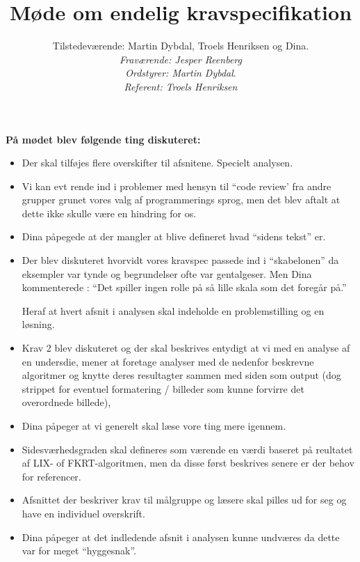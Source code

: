 \documentclass[a4paper,10pt,draft]{article}
\begin{document}
\title{Møde om endelig kravspecifikation}
\author{Tilstedeværende: Martin Dybdal, Troels Henriksen og Dina.\\
\textit{Fraværende: Jesper Reenberg}\\
\textit{Ordstyrer: Martin Dybdal}.\\
\textit{Referent: Troels Henriksen}}
\maketitle


\textbf{På mødet blev følgende ting diskuteret:}
\\

\begin{itemize}

    \item Der skal tilføjes flere overskifter til afsnitene. Specielt analysen.

	\item Vi kan evt rende ind i problemer med hensyn til ``code review' fra andre grupper grunet vores valg af programmerings sprog, men det blev aftalt at dette ikke skulle være en hindring for os.

	\item Dina påpegede at der mangler at blive defineret hvad ``sidens tekst'' er.

	\item Der blev diskuteret hvorvidt vores kravspec passede ind i ``skabelonen'' da eksempler var tynde og begrundelser ofte var gentalgeser. Men Dina kommenterede : ``Det spiller ingen rolle på så lille skala som det foregår på.''

	Heraf at hvert afsnit i analysen skal indeholde en problemstilling og en løsning.

	\item Krav 2 blev diskuteret og der skal beskrives entydigt at vi med en analyse af en undersdie, mener at foretage analyser med de nedenfor beskrevne algoritmer og knytte deres resultagter sammen med siden som output (dog strippet for eventuel formatering / billeder som kunne forvirre det overordnede billede),

	\item Dina påpeger at vi generelt skal læse vore ting mere igennem.

	\item Sidesværhedsgraden skal defineres som værende en værdi baseret på reultatet af LIX- of FKRT-algoritmen, men da disse først beskrives senere er der behov for referencer.

	\item  Afsnittet der beskriver krav til målgruppe og læsere skal pilles ud for seg og have en individuel overskrift.

	\item Dina påpeger at det indledende afsnit i analysen kunne undværes da dette var for meget ``hyggesnak''.

\end{itemize}
\end{document}
